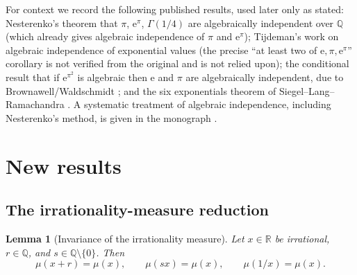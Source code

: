 \documentclass[11pt]{amsart}
\newtheorem{lemma}[theorem]{Lemma}
\theoremstyle{definition}
\theoremstyle{remark}
\numberwithin{equation}{section}
\newcommand{\Q}{\mathbb{Q}}
\newcommand{\R}{\mathbb{R}}
\newcommand{\irr}{\mu}
\newcommand{\ee}{\mathrm{e}}
\begin{document}
For context we record the following published results, used later only as stated: Nesterenko's theorem that $\pi$, $\ee^\pi$, $\Gamma(1/4)$ are algebraically independent over $\Q$ \cite{Nesterenko1996} (which already gives algebraic independence of $\pi$ and $\ee^\pi$); Tijdeman's work on algebraic independence of exponential values \cite{Tijdemann1971} (the precise ``at least two of $\ee,\pi,\ee^\pi$'' corollary is not verified from the original and is not relied upon); the conditional result that if $\ee^{\pi^2}$ is algebraic then $\ee$ and $\pi$ are algebraically independent, due to Brownawell/Waldschmidt \cite{Brownawell1974}; and the six exponentials theorem of Siegel--Lang--Ramachandra \cite{Lang1966,Ramachandra1968}. A systematic treatment of algebraic independence, including Nesterenko's method, is given in the monograph \cite{Zhu2024}.

\section{New results}\label{sec:new}

\subsection{The irrationality-measure reduction}

\begin{lemma}[Invariance of the irrationality measure]\label{lem:invariance}
Let $x\in\R$ be irrational, $r\in\Q$, and $s\in\Q\setminus\{0\}$. Then
\[
\irr(x+r)=\irr(x),\qquad \irr(sx)=\irr(x),\qquad \irr(1/x)=\irr(x).
\]
\end{lemma}
\end{document}
